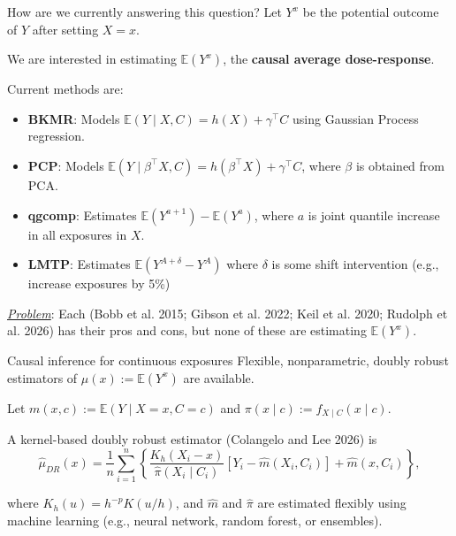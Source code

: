 \documentclass[
  ignorenonframetext,
  aspectratio=169,
  11pt]{beamer}
\newcounter{none} %
\providecommand{\tightlist}{%
  \setlength{\itemsep}{0pt}\setlength{\parskip}{0pt}}
\begin{document}
\begin{frame}{How are we currently answering this question?}
\protect{}\label{how-are-we-currently-answering-this-question}
Let \(Y^x\) be the potential outcome of \(Y\) after setting \(X=x\).

We are interested in estimating \(\mathbb{E}(Y^x)\), the
\textbf{causal average dose-response}.

\pause

Current methods are:

\begin{itemize}[<+->]
\tightlist
\item
  \textbf{BKMR}: Models \(\mathbb{E}(Y\mid X,C)=h(X)+\gamma^\top C\)
  using Gaussian Process regression.
\item
  \textbf{PCP}: Models
  \(\mathbb{E}(Y\mid \beta^\top X,C)=h(\beta^\top X)+\gamma^\top C\),
  where \(\beta\) is obtained from PCA.
\item
  \textbf{qgcomp}: Estimates \(\mathbb{E}(Y^{a+1})-\mathbb{E}(Y^a)\),
  where \(a\) is joint quantile increase in all exposures in \(X\).
\item
  \textbf{LMTP}: Estimates \(\mathbb{E}(Y^{A+\delta}-Y^A)\) where
  \(\delta\) is some shift intervention (e.g., increase exposures by
  5\%)
\end{itemize}

\pause

\underline{\textit{Problem}}: Each {\color{emoryblue}(Bobb et al. 2015;
Gibson et al. 2022; Keil et al. 2020; Rudolph et al. 2026)} has their
pros and cons, but none of these are estimating \(\mathbb{E}(Y^x)\).
\end{frame}

\begin{frame}{Causal inference for continuous exposures}
\protect{}\label{causal-inference-for-continuous-exposures}
Flexible, nonparametric, doubly robust estimators of
\(\mu(x) := \mathbb{E}(Y^x)\) are available.

Let \(m(x,c) := \mathbb{E}(Y\mid X=x,C=c)\) and
\(\pi(x\mid c) := f_{X\mid C}(x\mid c)\).

\pause

A kernel-based doubly robust estimator {\color{emoryblue}(Colangelo and
Lee 2026)} is \[
\widehat{\mu}_{DR}(x)
=
\frac{1}{n}\sum_{i=1}^n
\left\{
\frac{K_h(X_i-x)}{\widehat{\pi}(X_i\mid C_i)}
[Y_i-\widehat m(X_i,C_i)]
+\widehat m(x,C_i)
\right\},
\]

where \(K_h(u)=h^{-p}K(u/h)\), and \(\widehat{m}\) and \(\widehat{\pi}\)
are estimated flexibly using machine learning (e.g., neural network,
random forest, or ensembles).
\end{frame}
\end{document}

